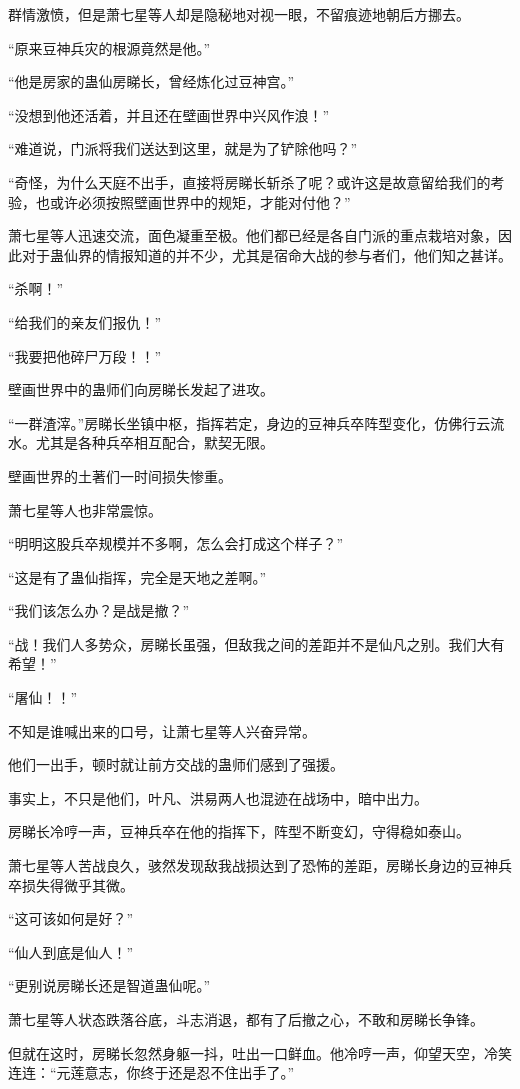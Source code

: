 \begin{this_body}
群情激愤，但是萧七星等人却是隐秘地对视一眼，不留痕迹地朝后方挪去。

“原来豆神兵灾的根源竟然是他。”

“他是房家的蛊仙房睇长，曾经炼化过豆神宫。”

“没想到他还活着，并且还在壁画世界中兴风作浪！”

“难道说，门派将我们送达到这里，就是为了铲除他吗？”

“奇怪，为什么天庭不出手，直接将房睇长斩杀了呢？或许这是故意留给我们的考验，也或许必须按照壁画世界中的规矩，才能对付他？”

萧七星等人迅速交流，面色凝重至极。他们都已经是各自门派的重点栽培对象，因此对于蛊仙界的情报知道的并不少，尤其是宿命大战的参与者们，他们知之甚详。

“杀啊！”

“给我们的亲友们报仇！”

“我要把他碎尸万段！！”

壁画世界中的蛊师们向房睇长发起了进攻。

“一群渣滓。”房睇长坐镇中枢，指挥若定，身边的豆神兵卒阵型变化，仿佛行云流水。尤其是各种兵卒相互配合，默契无限。

壁画世界的土著们一时间损失惨重。

萧七星等人也非常震惊。

“明明这股兵卒规模并不多啊，怎么会打成这个样子？”

“这是有了蛊仙指挥，完全是天地之差啊。”

“我们该怎么办？是战是撤？”

“战！我们人多势众，房睇长虽强，但敌我之间的差距并不是仙凡之别。我们大有希望！”

“屠仙！！”

不知是谁喊出来的口号，让萧七星等人兴奋异常。

他们一出手，顿时就让前方交战的蛊师们感到了强援。

事实上，不只是他们，叶凡、洪易两人也混迹在战场中，暗中出力。

房睇长冷哼一声，豆神兵卒在他的指挥下，阵型不断变幻，守得稳如泰山。

萧七星等人苦战良久，骇然发现敌我战损达到了恐怖的差距，房睇长身边的豆神兵卒损失得微乎其微。

“这可该如何是好？”

“仙人到底是仙人！”

“更别说房睇长还是智道蛊仙呢。”

萧七星等人状态跌落谷底，斗志消退，都有了后撤之心，不敢和房睇长争锋。

但就在这时，房睇长忽然身躯一抖，吐出一口鲜血。他冷哼一声，仰望天空，冷笑连连：“元莲意志，你终于还是忍不住出手了。”


\end{this_body}
